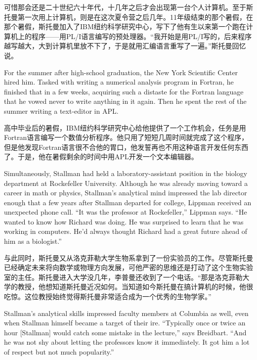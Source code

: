 \ifdefined\chs
可惜那会还是二十世纪六十年代，十几年之后才会出现第一台个人计算机。至于斯托曼第一次用上计算机，则是在这次夏令营之后几年。11年级结束的那个暑假，在那个暑假，斯托曼加入了IBM纽约科学研究中心，写下了他有生以来第一个跑在计算机上的程序——用PL/I语言编写的预处理器。``我开始是用PL/I写的，后来程序越写越大，大到计算机里放不下了，于是就用汇编语言重写了一遍。''斯托曼回忆说。
\fi

\ifdefined\eng
For the summer after high-school graduation, the New York Scientific Center hired him.  Tasked with writing a numerical analysis program in Fortran, he finished that in a few weeks, acquiring such a distaste for the Fortran language that he vowed never to write anything in it again.  Then he spent the rest of the summer writing a text-editor in APL.
\fi

\ifdefined\chs
高中毕业后的暑假，IBM纽约科学研究中心给他提供了一个工作机会，任务是用Fortran语言编写一个数值分析程序。他只用了短短几周时间就完成了这个程序，但是他发现Fortran语言很不合他的胃口，他发誓再也不用这种语言开发任何东西了。于是，他在暑假剩余的时间中用APL开发一个文本编辑器。
\fi

\ifdefined\eng
Simultaneously, Stallman had held a laboratory-assistant position in the biology department at Rockefeller University. Although he was already moving toward a career in math or physics, Stallman's analytical mind impressed the lab director enough that a few years after Stallman departed for college, Lippman received an unexpected phone call. ``It was the professor at Rockefeller,'' Lippman says. ``He wanted to know how Richard was doing. He was surprised to learn that he was working in computers. He'd always thought Richard had a great future ahead of him as a biologist.''
\fi

\ifdefined\chs
与此同时，斯托曼又从洛克菲勒大学生物系拿到了一份实验员的工作。尽管斯托曼已经确定未来将向数学或物理方向发展，可他严密的思维还是打动了这个生物实验室的主任。斯托曼进入大学没几年，李普曼还收到了一个电话。``那是洛克菲勒大学的教授，他想知道斯托曼近况如何。当知道如今斯托曼在搞计算机的时候，他很吃惊。这位教授始终觉得斯托曼非常适合成为一个优秀的生物学家。''
\fi

\ifdefined\eng
Stallman's analytical skills impressed faculty members at Columbia as well, even when Stallman himself became a target of their ire. ``Typically once or twice an hour [Stallman] would catch some mistake in the lecture,'' says Breidbart. ``And he was not shy about letting the professors know it immediately. It got him a lot of respect but not much popularity.''
\fi


